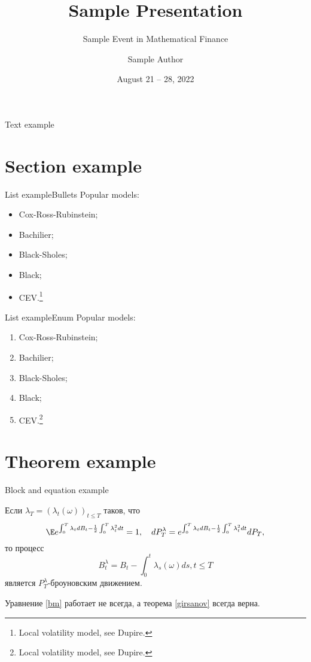 \documentclass[aspectratio=169]{beamer}
\title{Sample Presentation}
\subtitle{Sample Event in Mathematical Finance}
\author{Sample Author}
\institute{Vega Institute Foundation}
\date{August 21 -- 28, 2022}
\begin{document}
    \maketitle

    \begin{frame}{Text example}
        \lipsum[1]
    \end{frame}

    \section{Section example}
    \begin{frame}{List example}{Bullets}
        Popular models:
        \begin{itemize}
            \item Cox-Ross-Rubinstein;
            \item Bachilier;
            \item Black-Sholes;
            \item Black;
            \item CEV.\footnote{Local volatility model, see Dupire.}
        \end{itemize}
    \end{frame}

    \begin{frame}{List example}{Enum}
        Popular models:
        \begin{enumerate}
            \item Cox-Ross-Rubinstein;
            \item Bachilier;
            \item Black-Sholes;
            \item Black;
            \item CEV.\footnote{Local volatility model, see Dupire.}
        \end{enumerate}
    \end{frame}

    \section{Theorem example}
    \begin{frame}{Block  and equation example}
        \begin{theorem}[И. Гирсанов]\label{girsanov}
			Если $\lambda_T = (\lambda_t (\omega))_{t \leq T}$ таков, что 
			\begin{equation}
             \E e^{\int_0^T \lambda_t dB_t - \frac{1}{2}\int_0^T \lambda_t^2 dt} = 1, \quad dP_T^\lambda = e^{\int_0^T \lambda_t dB_t - \frac{1}{2}\int_0^T \lambda_t^2 dt} dP_T,
			\end{equation}
			то процесс 
			\begin{equation}\label{bm}
				B^\lambda_t = B_t - \int_0^t \lambda_s(\omega) ds, t \leq T
			\end{equation}
			 является $P_T^\lambda$-броуновским движением.
		\end{theorem}
        Уравнение \eqref{bm} работает не всегда, а теорема \ref{girsanov} всегда верна.
    \end{frame}
\end{document}

